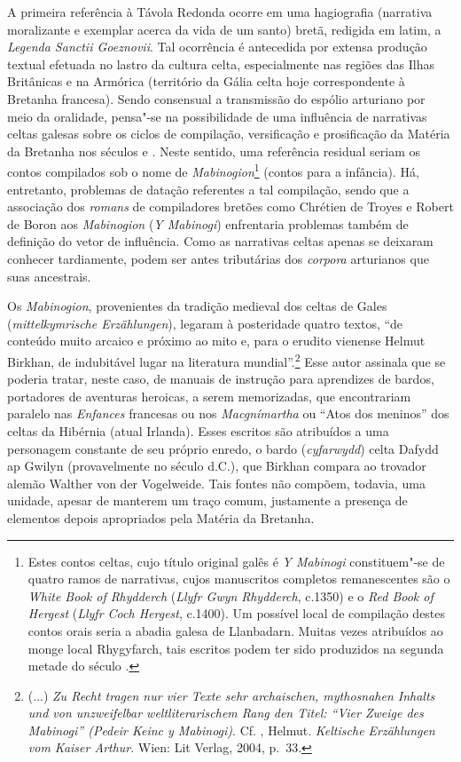 A primeira referência à Távola Redonda ocorre em uma hagiografia (narrativa
moralizante e exemplar acerca da vida de um santo) bretã, redigida em latim, a
\textit{Legenda Sanctii Goeznovii}. Tal ocorrência é antecedida por extensa
produção textual efetuada no lastro da cultura celta, especialmente nas regiões
das Ilhas Britânicas e na Armórica (território da Gália celta hoje
correspondente à Bretanha francesa). Sendo consensual a transmissão do espólio
arturiano por meio da oralidade, pensa"-se na possibilidade de uma influência de
narrativas celtas galesas sobre os ciclos de compilação, versificação e
prosificação da Matéria da Bretanha nos séculos  e . Neste sentido, uma
referência residual seriam os contos compilados sob o nome de
\textit{Mabinogion}\footnote{ Estes contos celtas, cujo título original galês é
\textit{Y Mabinogi} constituem"-se de quatro ramos de narrativas, cujos
manuscritos completos remanescentes são o \textit{White Book of Rhydderch}
(\textit{Llyfr Gwyn Rhydderch}, c.1350) e o \textit{Red Book of Hergest}
(\textit{Llyfr Coch Hergest}, c.1400). Um possível local de compilação destes
contos orais seria a abadia galesa de Llanbadarn. Muitas vezes atribuídos ao
monge local Rhygyfarch, tais escritos podem ter sido produzidos na segunda
metade do século .} (contos para a infância). Há, entretanto, problemas de
datação referentes a tal compilação, sendo que a associação dos
\textit{romans} de compiladores bretões como Chrétien de Troyes e Robert de Boron
aos \textit{Mabinogion} (\textit{Y Mabinogi}) enfrentaria problemas também de
definição do vetor de influência. Como as narrativas celtas apenas se deixaram
conhecer tardiamente, podem ser antes tributárias dos \textit{corpora}
arturianos que suas ancestrais.

Os \textit{Mabinogion}, provenientes da tradição medieval dos celtas de Gales
(\textit{mittelkymrische Erzählungen}), legaram à posteridade quatro textos,
“de conteúdo muito arcaico e próximo ao mito e, para o erudito vienense Helmut
Birkhan, de indubitável lugar na literatura mundial”.\footnote{ (...) \textit{Zu
Recht tragen nur vier Texte sehr archaischen, mythosnahen Inhalts und von
unzweifelbar weltliterarischem Rang den Titel: “Vier Zweige des Mabinogi”
(Pedeir Keinc y Mabinogi)}. Cf. , Helmut. \textit{Keltische Erzählungen
vom Kaiser Arthur}. Wien: Lit Verlag, 2004, p.~33. } Esse autor assinala que
se poderia tratar, neste caso, de manuais de instrução para aprendizes de
bardos, portadores de aventuras heroicas, a serem memorizadas, que encontrariam
paralelo nas \textit{Enfances }francesas ou nos \textit{Macgnímartha} ou “Atos
dos meninos” dos celtas da Hibérnia (atual Irlanda). Esses escritos são atribuídos a uma
personagem constante de seu próprio enredo, o bardo (\textit{cyfarwydd}) celta
Dafydd ap Gwilyn (provavelmente no século  d.C.), que Birkhan compara ao
trovador alemão Walther von der Vogelweide. Tais fontes não compõem, todavia,
uma unidade, apesar de manterem um traço comum, justamente a presença de
elementos depois apropriados pela Matéria da Bretanha. 

